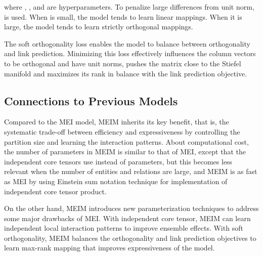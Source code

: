 \documentclass{article}
\theoremstyle{plain}
\theoremstyle{remark}
\begin{document}
where , , and  are hyperparameters. To penalize large differences from unit norm,  is used. When  is small, the model tends to learn linear mappings. When it is large, the model tends to learn strictly orthogonal mappings. 

The soft orthogonality loss enables the model to balance between orthogonality and link prediction. Minimizing this loss effectively influences the column vectors to be orthogonal and have unit norms, pushes the matrix  close to the Stiefel manifold and maximizes its rank in balance with the link prediction objective. 

\subsection{Connections to Previous Models} \label{sect:connection_advantage}
Compared to the MEI model, MEIM inherits its key benefit, that is, the systematic trade-off between efficiency and expressiveness by controlling the partition size and learning the interaction patterns. About computational cost, the number of parameters in MEIM is similar to that of MEI, except that the independent core tensors use  instead of  parameters, but this becomes less relevant when the number of entities and relations are large, and MEIM is as fast as MEI by using Einstein sum notation technique for implementation of independent core tensor product. 

On the other hand, MEIM introduces new parameterization techniques to address some major drawbacks of MEI. With independent core tensor, MEIM can learn independent local interaction patterns to improve ensemble effects. With soft orthogonality, MEIM balances the orthogonality and link prediction objectives to learn max-rank mapping that improves expressiveness of the model.
\end{document}
